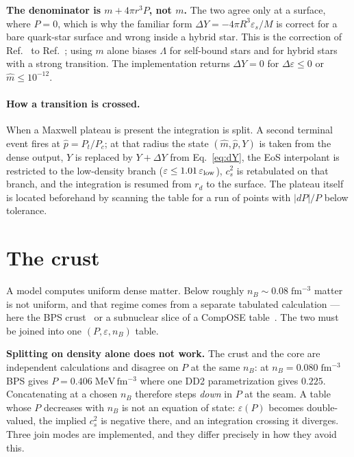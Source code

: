 \documentclass[aps,prc,onecolumn,superscriptaddress,nofootinbib,10pt]{revtex4-2}
\newcommand{\nB}{n_B}
\begin{document}
\textbf{The denominator is $m + 4\pi r^3 P$, not $m$.} The two agree only at a
surface, where $P = 0$, which is why the familiar form
$\Delta Y = -4\pi R^3 \varepsilon_s/M$ is correct for a bare quark-star surface
and wrong inside a hybrid star. This is the correction of
Ref.~\cite{TakatsyKovacs2020} to Ref.~\cite{Postnikov2010}; using $m$ alone
biases $\Lambda$ for self-bound stars and for hybrid stars with a strong
transition. The implementation returns $\Delta Y = 0$ for
$\Delta\varepsilon \le 0$ or $\hat m \le 10^{-12}$.

\paragraph{How a transition is crossed.} When a Maxwell plateau is present the
integration is split. A second terminal event fires at $\hat p = P_t/P_c$; at
that radius the state $(\hat m, \hat p, Y)$ is taken from the dense output, $Y$
is replaced by $Y + \Delta Y$ from Eq.~\eqref{eq:dY}, the EoS interpolant is
restricted to the low-density branch ($\varepsilon \le 1.01\,\varepsilon_{\rm
low}$), $c_s^2$ is retabulated on that branch, and the integration is resumed
from $r_d$ to the surface. The plateau itself is located beforehand by scanning
the table for a run of points with $|dP|/P$ below tolerance.

\section{The crust}
\label{sec:crust}

A model computes uniform dense matter. Below roughly
$\nB \sim 0.08\;\mathrm{fm^{-3}}$ matter is not uniform, and that regime comes
from a separate tabulated calculation --- here the BPS
crust~\cite{BaymPethickSutherland1971} or a subnuclear slice of a CompOSE
table~\cite{TypelCompOSE2015}. The two must be joined into one
$(P, \varepsilon, \nB)$ table.

\textbf{Splitting on density alone does not work.} The crust and the core are
independent calculations and disagree on $P$ at the same $\nB$: at
$\nB = 0.080\;\mathrm{fm^{-3}}$ BPS gives $P = 0.406\;\mathrm{MeV\,fm^{-3}}$
where one DD2 parametrization gives $0.225$. Concatenating at a chosen
$\nB$ therefore steps \emph{down} in $P$ at the seam. A table whose $P$
decreases with $\nB$ is not an equation of state: $\varepsilon(P)$ becomes
double-valued, the implied $c_s^2$ is negative there, and an integration
crossing it diverges. Three join modes are implemented, and they differ
precisely in how they avoid this.
\end{document}
